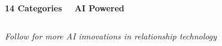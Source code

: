 \documentclass[aspectratio=169]{beamer}
\begin{document}
{\begin{frame}
\begin{center}
\begin{columns}[T]
            \begin{center}
                \textcolor{googlegreen}{\Large{}}\\
                \small\textbf{14 Categories}
            \end{center}
            
            \begin{center}
                \textcolor{googleyellow}{\Large{}}\\
                \small\textbf{AI Powered}
            \end{center}
        \end{columns}
        
        \vspace{0.6cm}
        {\small\color{darkgray}\textit{Follow for more AI innovations in relationship technology}}
    \end{center}
\end{frame}
}
\end{document}
